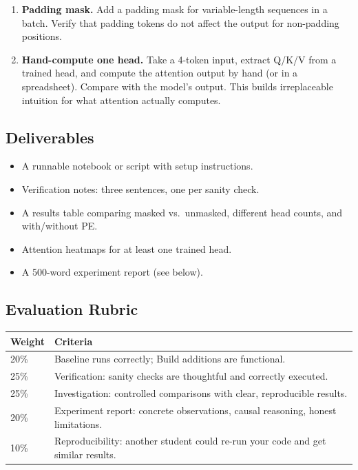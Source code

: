 \begin{enumerate}
    \item \optional{} \textbf{Padding mask.} Add a padding mask for variable-length sequences in a batch. Verify that padding tokens do not affect the output for non-padding positions.
    \item \tierstretch{} \textbf{Hand-compute one head.} Take a 4-token input, extract Q/K/V from a trained head, and compute the attention output by hand (or in a spreadsheet). Compare with the model's output. This builds irreplaceable intuition for what attention actually computes.
\end{enumerate}

\subsection*{Deliverables}

\begin{itemize}
    \item A runnable notebook or script with setup instructions.
    \item Verification notes: three sentences, one per sanity check.
    \item A results table comparing masked vs.\ unmasked, different head counts, and with/without PE.
    \item Attention heatmaps for at least one trained head.
    \item A 500-word experiment report (see below).
\end{itemize}

\subsection*{Evaluation Rubric}

\begin{center}
\begin{tabular}{lp{}}
\toprule
Weight & Criteria \\
\midrule
20\% & Baseline runs correctly; Build additions are functional. \\
25\% & Verification: sanity checks are thoughtful and correctly executed. \\
25\% & Investigation: controlled comparisons with clear, reproducible results. \\
20\% & Experiment report: concrete observations, causal reasoning, honest limitations. \\
10\% & Reproducibility: another student could re-run your code and get similar results. \\
\bottomrule
\end{tabular}
\end{center}


